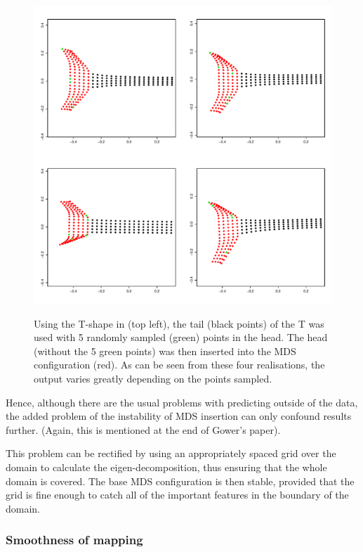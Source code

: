 \begin{figure}
\centering
\includegraphics[width=6in]{mds/figs/tshaperand.pdf} \\
\caption{Using the T-shape in  (top left), the tail (black points) of the T was used with 5 randomly sampled (green) points in the head. The head (without the 5 green points) was then inserted into the MDS configuration (red). As can be seen from these four realisations, the output varies greatly depending on the points sampled.}
\label{tshaperand}
\end{figure}

Hence, although there are the usual problems with predicting outside of the data, the added problem of the instability of MDS insertion can only confound results further. (Again, this is mentioned at the end of Gower's paper).

This problem can be rectified by using an appropriately spaced grid over the domain to calculate the eigen-decomposition, thus ensuring that the whole domain is covered. The base MDS configuration is then stable, provided that the grid is fine enough to catch all of the important features in the boundary of the domain.

\subsubsection{Smoothness of mapping}
\label{mds-smoothness}

